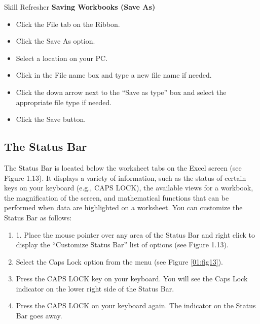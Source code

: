 \begin{center}
	\begin{sklbox}{Skill Refresher}
		\textbf{Saving Workbooks (Save As)}
		\\
		\begin{itemize}
			\setlength{\itemsep}{0pt}
			\setlength{\parskip}{0pt}
			\setlength{\parsep}{0pt}
			
			\item Click the File tab on the Ribbon.
			\item Click the Save As option.
			\item Select a location on your PC.
			\item Click in the File name box and type a new file name if needed.
			\item Click the down arrow next to the ``Save as type'' box and select the appropriate file type if needed.
			\item Click the Save button.
		
		\end{itemize}
	\end{sklbox}
\end{center}

\subsection{The Status Bar}

The Status Bar is located below the worksheet tabs on the Excel screen (see Figure 1.13). It displays a variety of information, such as the status of certain keys on your keyboard (e.g., CAPS LOCK), the available views for a workbook, the magnification of the screen, and mathematical functions that can be performed when data are highlighted on a worksheet. You can customize the Status Bar as follows:

\begin{enumerate}
	\item 1. Place the mouse pointer over any area of the Status Bar and right click to display the ``Customize Status Bar'' list of options (see Figure 1.13).
	\item Select the Caps Lock option from the menu (see Figure \ref{01:fig13}).
	\item Press the CAPS LOCK key on your keyboard. You will see the Caps Lock indicator on the lower right side of the Status Bar.
	\item Press the CAPS LOCK on your keyboard again. The indicator on the Status Bar goes away.
\end{enumerate}

